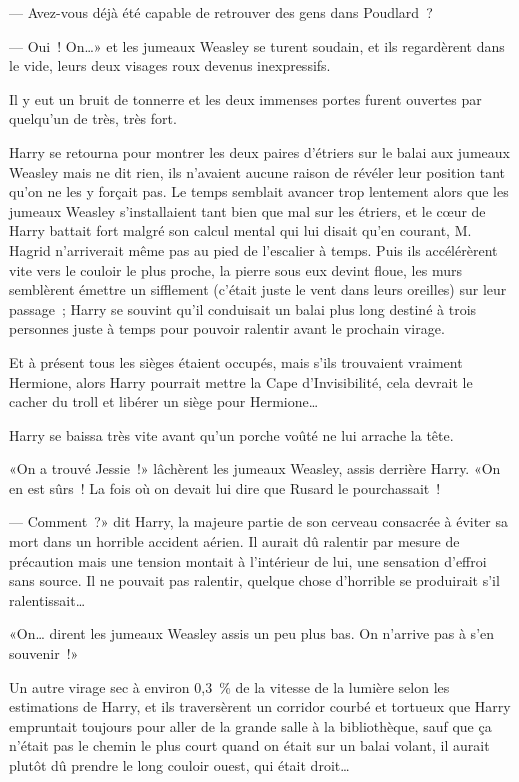 --- Avez-vous déjà été capable de retrouver des gens dans Poudlard~?

--- Oui~! On…» et les jumeaux Weasley se turent soudain, et ils regardèrent dans le vide, leurs deux visages roux devenus inexpressifs.

Il y eut un bruit de tonnerre et les deux immenses portes furent ouvertes par quelqu'un de très, très fort.

Harry se retourna pour montrer les deux paires d'étriers sur le balai aux jumeaux Weasley mais ne dit rien, ils n'avaient aucune raison de révéler leur position tant qu'on ne les y forçait pas. Le temps semblait avancer trop lentement alors que les jumeaux Weasley s'installaient tant bien que mal sur les étriers, et le cœur de Harry battait fort malgré son calcul mental qui lui disait qu'en courant, M. Hagrid n'arriverait même pas au pied de l'escalier à temps. Puis ils accélérèrent vite vers le couloir le plus proche, la pierre sous eux devint floue, les murs semblèrent émettre un sifflement (c'était juste le vent dans leurs oreilles) sur leur passage~; Harry se souvint qu'il conduisait un balai plus long destiné à trois personnes juste à temps pour pouvoir ralentir avant le prochain virage.

Et à présent tous les sièges étaient occupés, mais s'ils trouvaient vraiment Hermione, alors Harry pourrait mettre la Cape d'Invisibilité, cela devrait le cacher du troll et libérer un siège pour Hermione…

Harry se baissa très vite avant qu'un porche voûté ne lui arrache la tête.

«On a trouvé Jessie~!» lâchèrent les jumeaux Weasley, assis derrière Harry. «On en est sûrs~! La fois où on devait lui dire que Rusard le pourchassait~!

--- Comment~?» dit Harry, la majeure partie de son cerveau consacrée à éviter sa mort dans un horrible accident aérien. Il aurait dû ralentir par mesure de précaution mais une tension montait à l'intérieur de lui, une sensation d'effroi sans source. Il ne pouvait pas ralentir, quelque chose d'horrible se produirait s'il ralentissait…

«On… dirent les jumeaux Weasley assis un peu plus bas. On n'arrive pas à s'en souvenir~!»

Un autre virage sec à environ 0,3~\% de la vitesse de la lumière selon les estimations de Harry, et ils traversèrent un corridor courbé et tortueux que Harry empruntait toujours pour aller de la grande salle à la bibliothèque, sauf que ça n'était pas le chemin le plus court quand on était sur un balai volant, il aurait plutôt dû prendre le long couloir ouest, qui était droit…

